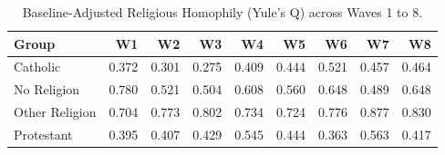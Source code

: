 \begin{table}

\caption{\label{tab:yules-q}Baseline-Adjusted Religious Homophily (Yule's Q) across Waves 1 to 8.}
\centering
\begin{tabular}[t]{lrrrrrrrr}
\toprule
Group & W1 & W2 & W3 & W4 & W5 & W6 & W7 & W8\\
\midrule
Catholic & 0.372 & 0.301 & 0.275 & 0.409 & 0.444 & 0.521 & 0.457 & 0.464\\
No Religion & 0.780 & 0.521 & 0.504 & 0.608 & 0.560 & 0.648 & 0.489 & 0.648\\
Other Religion & 0.704 & 0.773 & 0.802 & 0.734 & 0.724 & 0.776 & 0.877 & 0.830\\
Protestant & 0.395 & 0.407 & 0.429 & 0.545 & 0.444 & 0.363 & 0.563 & 0.417\\
\bottomrule
\end{tabular}
\end{table}